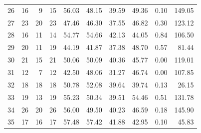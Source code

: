 \begin{longtable}{rrrrrrrrrr}
26 & 16 & 9 & 15 & 56.03 & 48.15 & 39.59 & 49.36 & 0.10 & 149.05 \\
27 & 23 & 20 & 23 & 47.46 & 46.30 & 37.55 & 46.82 & 0.30 & 123.12 \\
28 & 16 & 11 & 14 & 54.77 & 54.66 & 42.13 & 44.05 & 0.84 & 106.50 \\
29 & 20 & 11 & 19 & 44.19 & 41.87 & 37.38 & 48.70 & 0.57 & 81.44 \\
30 & 21 & 15 & 21 & 50.06 & 50.09 & 40.36 & 45.77 & 0.00 & 119.01 \\
31 & 12 & 7 & 12 & 42.50 & 48.06 & 31.27 & 46.74 & 0.00 & 107.85 \\
32 & 18 & 18 & 18 & 50.78 & 52.08 & 39.64 & 39.74 & 0.13 & 26.15 \\
33 & 19 & 13 & 19 & 55.23 & 50.34 & 39.51 & 54.46 & 0.51 & 131.78 \\
34 & 26 & 20 & 26 & 56.00 & 49.50 & 40.23 & 46.59 & 0.18 & 145.90 \\
35 & 17 & 16 & 17 & 57.48 & 57.42 & 41.88 & 42.95 & 0.10 & 45.83 \\

\end{longtable}

\endgroup
